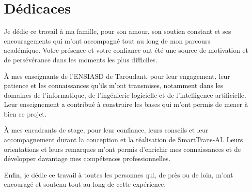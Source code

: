 \chapter*{Dédicaces}

Je dédie ce travail à ma famille, pour son amour, son soutien constant et ses encouragements qui m'ont accompagné tout au long de mon parcours académique. Votre présence et votre confiance ont été une source de motivation et de persévérance dans les moments les plus difficiles.

À mes enseignants de l'ENSIASD de Taroudant, pour leur engagement, leur patience et les connaissances qu'ils m'ont transmises, notamment dans les domaines de l'informatique, de l'ingénierie logicielle et de l'intelligence artificielle. Leur enseignement a contribué à construire les bases qui m'ont permis de mener à bien ce projet.

À mes encadrants de stage, pour leur confiance, leurs conseils et leur accompagnement durant la conception et la réalisation de SmartTrans-AI. Leurs orientations et leurs remarques m'ont permis d'enrichir mes connaissances et de développer davantage mes compétences professionnelles.

Enfin, je dédie ce travail à toutes les personnes qui, de près ou de loin, m'ont encouragé et soutenu tout au long de cette expérience.
